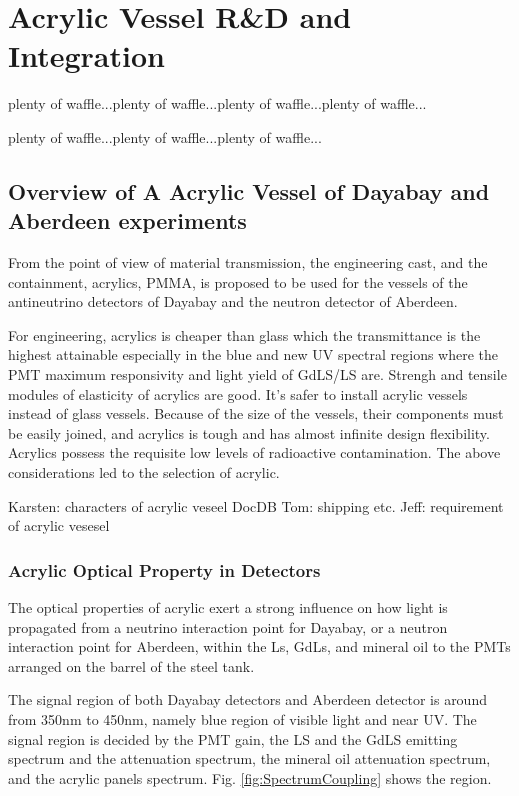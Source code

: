 \chapter {Acrylic Vessel R\&D and Integration}

plenty of waffle...plenty of waffle...plenty of waffle...plenty of waffle...

plenty of waffle...plenty of waffle...plenty of waffle...


\section {Overview of A Acrylic Vessel of Dayabay and Aberdeen experiments}

From the point of view of material transmission, the engineering cast, and the containment, 
acrylics, PMMA, is proposed to be used for the vessels of the antineutrino detectors of Dayabay and the neutron detector of Aberdeen.

For engineering, acrylics is cheaper than glass which the transmittance is the highest attainable
especially in the blue and new UV spectral regions where the PMT maximum responsivity and light yield of GdLS/LS are.
Strengh and tensile modules of elasticity of acrylics are good.
It's safer to install acrylic vessels instead of glass vessels.
Because of the size of the vessels, their components must be easily joined, and acrylics
is tough and has almost infinite design flexibility.
Acrylics possess the requisite low levels of radioactive contamination.
The above considerations led to the selection of acrylic.


Karsten: characters of acrylic veseel DocDB
Tom: shipping etc.
Jeff: requirement of acrylic vesesel

\subsection {Acrylic Optical Property in Detectors}

The optical properties of acrylic exert a strong influence on how light is propagated
from a neutrino interaction point for Dayabay, or a neutron interaction point for Aberdeen,
within the Ls, GdLs, and mineral oil to the PMTs arranged on the barrel of the steel tank.

The signal region of both Dayabay detectors and Aberdeen detector
is around from 350nm to 450nm, namely blue region of visible light and near UV.
The signal region is decided by the PMT gain, the LS and the GdLS emitting spectrum and
the attenuation spectrum, the mineral oil attenuation spectrum, and
the acrylic panels spectrum. Fig. \ref{fig:SpectrumCoupling} shows the region.


